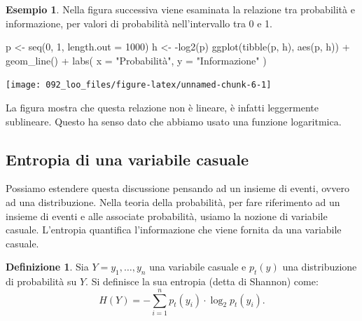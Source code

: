 \documentclass[
  10pt,
  italian,
  a4paper,
  extrafontsizes,onecolumn,openright
  ]{memoir}
\newenvironment{Shaded}{\begin{snugshade}}{\end{snugshade}}
\newcommand{\AttributeTok}[1]{\textcolor[rgb]{0.77,0.63,0.00}{#1}}
\newcommand{\DecValTok}[1]{\textcolor[rgb]{0.00,0.00,0.81}{#1}}
\newcommand{\FunctionTok}[1]{\textcolor[rgb]{0.00,0.00,0.00}{#1}}
\newcommand{\NormalTok}[1]{#1}
\newcommand{\OtherTok}[1]{\textcolor[rgb]{0.56,0.35,0.01}{#1}}
\newcommand{\SpecialCharTok}[1]{\textcolor[rgb]{0.00,0.00,0.00}{#1}}
\newcommand{\StringTok}[1]{\textcolor[rgb]{0.31,0.60,0.02}{#1}}
\theoremstyle{definition}
\newtheorem{definition}{Definizione}[chapter]
\theoremstyle{definition}
\newtheorem{example}{Esempio}[chapter]
\theoremstyle{definition}
\theoremstyle{definition}
\theoremstyle{remark}
\begin{document}
\begin{example}
Nella figura successiva viene esaminata la relazione tra probabilità e informazione, per valori di probabilità nell'intervallo tra 0 e 1.

\begin{Shaded}
\begin{Highlighting}[]
\NormalTok{p }\OtherTok{\textless{}{-}} \FunctionTok{seq}\NormalTok{(}\DecValTok{0}\NormalTok{, }\DecValTok{1}\NormalTok{, }\AttributeTok{length.out =} \DecValTok{1000}\NormalTok{)}
\NormalTok{h }\OtherTok{\textless{}{-}} \SpecialCharTok{{-}}\FunctionTok{log2}\NormalTok{(p)}
\FunctionTok{ggplot}\NormalTok{(}\FunctionTok{tibble}\NormalTok{(p, h), }\FunctionTok{aes}\NormalTok{(p, h)) }\SpecialCharTok{+}
  \FunctionTok{geom\_line}\NormalTok{() }\SpecialCharTok{+}
  \FunctionTok{labs}\NormalTok{(}
    \AttributeTok{x =} \StringTok{"Probabilità"}\NormalTok{,}
    \AttributeTok{y =} \StringTok{"Informazione"}
\NormalTok{  )}
\end{Highlighting}
\end{Shaded}

\begin{center}\texttt{[image: 092\_loo\_files/figure-latex/unnamed-chunk-6-1]} \end{center}

\noindent
La figura mostra che questa relazione non è lineare, è infatti leggermente sublineare. Questo ha senso dato che abbiamo usato una funzione logaritmica.
\end{example}

\hypertarget{entropia-di-una-variabile-casuale}{%
\subsection{Entropia di una variabile casuale}\label{entropia-di-una-variabile-casuale}}

Possiamo estendere questa discussione pensando ad un insieme di eventi, ovvero ad una distribuzione. Nella teoria della probabilità, per fare riferimento ad un insieme di eventi e alle associate probabilità, usiamo la nozione di variabile casuale. L'entropia quantifica l'informazione che viene fornita da una variabile casuale.

\begin{definition}
Sia \(Y = y_1, \dots, y_n\) una variabile casuale e \(p_t(y)\) una distribuzione di probabilità su \(Y\). Si definisce la sua entropia (detta di Shannon) come:
\begin{equation}
H(Y) = - \sum_{i=1}^n p_t(y_i) \cdot \log_2 p_t(y_i).
\label{eq:entropy}
\end{equation}
\end{definition}
\end{document}
